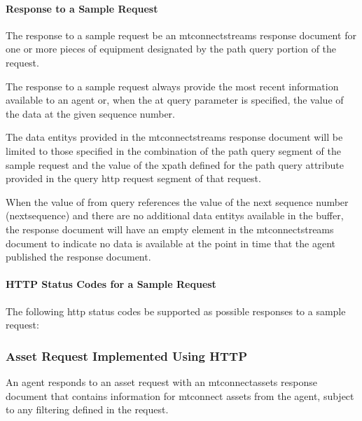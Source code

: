 

\paragraph{Response to a Sample Request}\mbox{}

The \gls{response} to a \gls{sample request} \SHOULD be an \gls{mtconnectstreams response document} for one or more pieces of equipment designated by the \gls{path query} portion of the \gls{request}.

The \gls{response} to a \gls{sample request} \MUST always provide the most recent information available to an \gls{agent} or, when the \gls{at query} parameter is specified, the value of the data at the given \gls{sequence number}.

The \glspl{data entity} provided in the \gls{mtconnectstreams response document} will be limited to those specified in the combination of the \gls{path query} segment of the \gls{sample request} and the value of the \gls{xpath} defined for the \gls{path query} attribute provided in the \gls{query http request} segment of that \gls{request}.

When the value of \gls{from query} references the value of the next \gls{sequence number} (\gls{nextsequence}) and there are no additional \glspl{data entity} available in the buffer, the response document will have an empty  element in the \gls{mtconnectstreams} document to indicate no data is available at the point in time that the \gls{agent} published the \gls{response document}.

\paragraph{HTTP Status Codes for a Sample Request}\mbox{}

The following \glspl{http status code} \MUST be supported as possible responses to a \gls{sample request}:



\subsubsection{Asset Request Implemented Using HTTP}

An \gls{agent} responds to an \gls{asset request} with an \gls{mtconnectassets response document} that contains information for \glspl{mtconnect asset} from the \gls{agent}, subject to any filtering defined in the \gls{request}.

